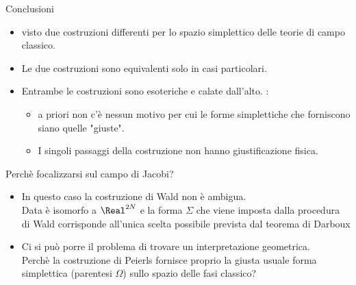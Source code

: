 	\begin{frame}{Conclusioni}
			\begin{itemize}
				\item visto due costruzioni differenti  per lo spazio simplettico delle teorie di campo classico.
				\item Le due costruzioni sono equivalenti  solo in casi particolari.
				\item Entrambe le costruzioni sono esoteriche e calate dall'alto. 
					:
						\begin{itemize}
							\item a priori non c'è nessun motivo per cui le forme simplettiche che forniscono siano quelle "giuste".
							\item I singoli passaggi della costruzione non hanno giustificazione fisica.
						\end{itemize}
			\end{itemize}
			
		\begin{block}{Perchè focalizzarsi sul campo di Jacobi?}
			\begin{itemize}
				\item
					In questo caso la costruzione di Wald non è ambigua. \\
					 Data è isomorfo a $\Real^{2N}$ e la forma $\Sigma$ che viene imposta dalla procedura di Wald corrisponde all'unica scelta possibile prevista dal teorema di Darboux
				\item Ci si può porre il problema di trovare un interpretazione geometrica.\\
				 Perchè la costruzione di Peierls fornisce proprio la giusta usuale forma simplettica (parentesi $\Omega$) sullo spazio delle fasi classico?
				
			\end{itemize}		
		\end{block}
	\end{frame}